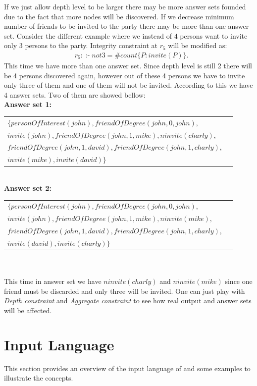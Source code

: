 \documentclass[14pt,a4paper, titlepage]{article}
\DeclareMathOperator{\leftimpl}{:-}
\begin{document}
If we just allow depth level to be larger there may be more answer sets founded due to the fact that more nodes will be discovered. If we decrease minimum number of friends to be invited to the party there may be more than one answer set. Consider the different example where we instead of 4 persons want to invite only 3 persons to the party. Integrity constraint at $r_5$ will be modified as:
\begin{align*}
& r_5 \colon \leftimpl \mathit{ not } \mathit{ 3 } =\mathit{\#count} \{ P : \mathit{invite(P)} \}.
\end{align*} 
 This time we have more than one answer set. Since depth level is still 2 there will be 4 persons discovered again, however out of these 4 persons we have to invite only three of them and one of them will not be invited. According to this we have 4 answer sets. Two of them are showed bellow:\\
\textbf{Answer set 1:}\\
\begin{tabular}{ l r }
   $\mathit{\{personOfInterest(john), friendOfDegree(john,0,john),}$& \\
   $\mathit{invite(john), friendOfDegree(john,1,mike), \mathit{ninvite(charly)},}$& \\
   $\mathit{friendOfDegree(john,1,david), friendOfDegree(john,1,charly),}$ & \\
   $\mathit{invite(mike),invite(david)\}}$
 \end{tabular}
\\ \textbf{Answer set 2:}\\
 \begin{tabular}{ l r }
   $\mathit{\{personOfInterest(john), friendOfDegree(john,0,john),}$& \\
   $\mathit{invite(john), friendOfDegree(john,1,mike), \mathit{ninvite(mike)},}$& \\
   $\mathit{friendOfDegree(john,1,david), friendOfDegree(john,1,charly),}$ & \\
   $\mathit{invite(david),invite(charly)\}}$
 \end{tabular}
\\ \\ This time in answer set we have $\mathit{ninvite(charly)}$ and $\mathit{ninvite(mike)}$ since one friend must be discarded and only three will be invited. One can just play with \emph{Depth constraint} and \emph{Aggregate constraint} to see how real output and answer sets will be affected.    


\section{Input Language}%
\label{sec:inputLang}
This section provides an overview of the input language of \dlvhex{} and some examples to illustrate the concepts. 
\end{document}
